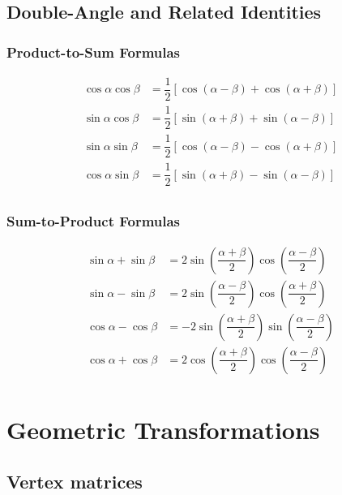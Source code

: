 \subsection{Double-Angle and Related Identities}

\subsubsection{Product-to-Sum Formulas}
\[\begin{aligned}
	\cos \alpha \cos \beta &= \dfrac{1}{2}[\cos(\alpha-\beta)+\cos(\alpha+\beta)] \\
	\sin \alpha \cos \beta &= \dfrac{1}{2}[\sin(\alpha+\beta)+\sin(\alpha-\beta)] \\
	\sin \alpha \sin \beta &= \dfrac{1}{2}[\cos(\alpha-\beta)-\cos(\alpha+\beta)] \\
	\cos \alpha \sin \beta &= \dfrac{1}{2}[\sin(\alpha+\beta)-\sin(\alpha-\beta)] \\
\end{aligned}\]

\subsubsection{Sum-to-Product Formulas}
\[\begin{aligned}
	\sin \alpha+\sin \beta &= 2\sin(\dfrac{\alpha+\beta}{2})\cos(\dfrac{\alpha-\beta}{2}) \nonumber \\
	\sin \alpha-\sin \beta &= 2\sin(\dfrac{\alpha-\beta}{2})\cos(\dfrac{\alpha+\beta}{2}) \nonumber \\
	\cos \alpha-\cos \beta &= -2\sin(\dfrac{\alpha+\beta}{2})\sin(\dfrac{\alpha-\beta}{2}) \nonumber \\
	\cos \alpha+\cos \beta &= 2\cos(\dfrac{\alpha+\beta}{2})\cos(\dfrac{\alpha-\beta}{2}) \nonumber \\
\end{aligned}\]

\columnbreak

\section{Geometric Transformations}

\subsection{Vertex matrices}

